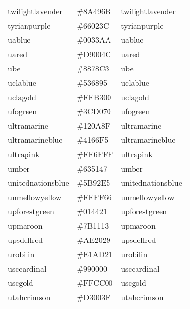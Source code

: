 \documentclass[
]{article}
\begin{document}
\begin{longtable}[]{@{}lll@{}}
twilightlavender & \colorbox[rgb]{0.54,0.29,0.42}{\#8A496B} &
\textcolor[rgb]{0.54,0.29,0.42}{twilightlavender      }\tabularnewline
tyrianpurple & \colorbox[rgb]{0.4,0.01,0.24}{\#66023C} &
\textcolor[rgb]{0.4,0.01,0.24}{tyrianpurple          }\tabularnewline
uablue & \colorbox[rgb]{0.0,0.2,0.67}{\#0033AA} &
\textcolor[rgb]{0.0,0.2,0.67}{uablue                }\tabularnewline
uared & \colorbox[rgb]{0.85,0.0,0.3}{\#D9004C} &
\textcolor[rgb]{0.85,0.0,0.3}{uared                 }\tabularnewline
ube & \colorbox[rgb]{0.53,0.47,0.76}{\#8878C3} &
\textcolor[rgb]{0.53,0.47,0.76}{ube                   }\tabularnewline
uclablue & \colorbox[rgb]{0.33,0.41,0.58}{\#536895} &
\textcolor[rgb]{0.33,0.41,0.58}{uclablue              }\tabularnewline
uclagold & \colorbox[rgb]{1.0,0.7,0.0}{\#FFB300} &
\textcolor[rgb]{1.0,0.7,0.0}{uclagold              }\tabularnewline
ufogreen & \colorbox[rgb]{0.24,0.82,0.44}{\#3CD070} &
\textcolor[rgb]{0.24,0.82,0.44}{ufogreen              }\tabularnewline
ultramarine & \colorbox[rgb]{0.07,0.04,0.56}{\#120A8F} &
\textcolor[rgb]{0.07,0.04,0.56}{ultramarine           }\tabularnewline
ultramarineblue & \colorbox[rgb]{0.25,0.4,0.96}{\#4166F5} &
\textcolor[rgb]{0.25,0.4,0.96}{ultramarineblue       }\tabularnewline
ultrapink & \colorbox[rgb]{1.0,0.44,1.0}{\#FF6FFF} &
\textcolor[rgb]{1.0,0.44,1.0}{ultrapink             }\tabularnewline
umber & \colorbox[rgb]{0.39,0.32,0.28}{\#635147} &
\textcolor[rgb]{0.39,0.32,0.28}{umber                 }\tabularnewline
unitednationsblue & \colorbox[rgb]{0.36,0.57,0.9}{\#5B92E5} &
\textcolor[rgb]{0.36,0.57,0.9}{unitednationsblue     }\tabularnewline
unmellowyellow & \colorbox[rgb]{1.0,1.0,0.4}{\#FFFF66} &
\textcolor[rgb]{1.0,1.0,0.4}{unmellowyellow        }\tabularnewline
upforestgreen & \colorbox[rgb]{0.0,0.27,0.13}{\#014421} &
\textcolor[rgb]{0.0,0.27,0.13}{upforestgreen         }\tabularnewline
upmaroon & \colorbox[rgb]{0.48,0.07,0.07}{\#7B1113} &
\textcolor[rgb]{0.48,0.07,0.07}{upmaroon              }\tabularnewline
upsdellred & \colorbox[rgb]{0.68,0.09,0.13}{\#AE2029} &
\textcolor[rgb]{0.68,0.09,0.13}{upsdellred            }\tabularnewline
urobilin & \colorbox[rgb]{0.88,0.68,0.13}{\#E1AD21} &
\textcolor[rgb]{0.88,0.68,0.13}{urobilin              }\tabularnewline
usccardinal & \colorbox[rgb]{0.6,0.0,0.0}{\#990000} &
\textcolor[rgb]{0.6,0.0,0.0}{usccardinal           }\tabularnewline
uscgold & \colorbox[rgb]{1.0,0.8,0.0}{\#FFCC00} &
\textcolor[rgb]{1.0,0.8,0.0}{uscgold               }\tabularnewline
utahcrimson & \colorbox[rgb]{0.83,0.0,0.25}{\#D3003F} &
\textcolor[rgb]{0.83,0.0,0.25}{utahcrimson           }\tabularnewline

\end{longtable}
\end{document}
